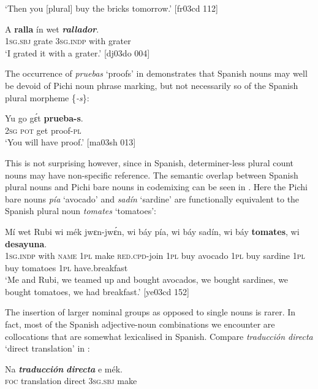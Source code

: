 \glt ‘Then you [plural] buy the bricks tomorrow.’ [fr03cd 112]
\z


\ea%
    \label{ex:key:1699}
    \gll A    \textbf{ralla}    ín    wet    \textbf{\textit{rallador}}.\\
\textsc{1sg.sbj}  grate  \textsc{3sg.indp}  with    grater\\
\glt ‘I grated it with a grater.’ [dj03do 004]
\z

The occurrence of \textit{pruebas} ‘proofs’ in  demonstrates that Spanish nouns may well be devoid of Pichi noun phrase marking, but not necessarily so of the Spanish plural morpheme \{\textit{{}-s}\}: 


\ea%
    \label{ex:key:1700}
    \gll Yu  go  gɛ́t  \textbf{prueba-s}.\\
\textsc{2sg}  \textsc{pot}  get  proof-\textsc{pl}\\

\glt ‘You will have proof.’ [ma03sh 013]
\z

This is not surprising however, since in Spanish, determiner-less plural count nouns may have non-specific reference. The semantic overlap between Spanish plural nouns and Pichi bare nouns in codemixing can be seen in . Here the Pichi bare nouns \textit{pía} ‘avocado’ and \textit{sadín} ‘sardine’ are functionally equivalent to the Spanish plural noun \textit{tomates} ‘tomatoes’:


\ea%
    \label{ex:key:1701}
    \gll Mí    wet    Rubi    wi  mék    jwɛn-jwɛ́n,  wi  báy  pía,
wi  báy  sadín,  wi  báy  \textbf{tomates},    wi  \textbf{desayuna}.\\
\textsc{1sg.indp}  with    \textsc{name}  \textsc{1pl}  make  \textsc{red}.\textsc{cpd}{}-join  \textsc{1pl}  buy  avocado
\textsc{1pl}  buy  sardine  \textsc{1pl}  buy  tomatoes  \textsc{1pl}  have.breakfast\\

\glt ‘Me and Rubi, we teamed up and bought avocados, we bought sardines, 
we bought tomatoes, we had breakfast.’ [ye03cd 152]
\z

The insertion of larger nominal groups as opposed to single nouns is rarer. In fact, most of the Spanish adjective-noun combinations we encounter are collocations that are somewhat lexicalised in Spanish. Compare \textit{traducción directa} ‘direct translation’ in :


\ea%
    \label{ex:key:1702}
    \gll Na  \textbf{\textit{traducción}}  \textbf{\textit{directa}}  e    mék.\\
\textsc{foc}  translation  direct  \textsc{3sg.sbj}  make\\

